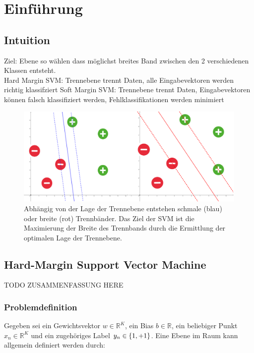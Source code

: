 \documentclass[a4paper,11pt,twoside]{scrreprt}
\begin{document}
\chapter{Einführung}

\section{Intuition}
Ziel: Ebene so wählen dass möglichst breites Band zwischen den 2 verschiedenen Klassen entsteht. \\

Hard Margin SVM: Trennebene trennt Daten, alle Eingabevektoren werden richtig klassifziert
Soft Margin SVM: Trennebene trennt Daten, Eingabevektoren können falsch klassifiziert werden, Fehlklassifikationen werden minimiert

\begin{figure}[H]
	\centering
	\includegraphics[width = 16cm]{assets/small_vs_big_margin.png}
	\caption{Abhängig von der Lage der Trennebene entstehen schmale (blau) oder breite (rot) Trennbänder. Das Ziel der \ac{SVM} ist die Maximierung der Breite des Trennbands durch die Ermittlung der optimalen Lage der Trennebene.}
	\label{fig:intuition_margin}
\end{figure}


\section{Hard-Margin Support Vector Machine} \label{sec:hard_margin}

TODO ZUSAMMENFASSUNG HERE

\subsection{Problemdefinition}
Gegeben sei ein Gewichtsvektor $w \in \mathbb{R}^{K}$, ein Bias $b \in \mathbb{R}$, ein beliebiger Punkt $x_{n} \in \mathbb{R}^{K}$ und ein zugehöriges Label $y_{n} \in \{\-1, +1\}$. Eine Ebene im Raum kann allgemein definiert werden durch:
\end{document}
